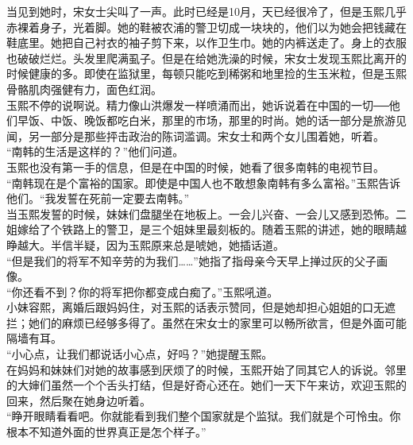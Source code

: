 当见到她时，宋女士尖叫了一声。此时已经是10月，天已经很冷了，但是玉熙几乎赤裸着身子，光着脚。她的鞋被农浦的警卫切成一块块的，他们以为她会把钱藏在鞋底里。她把自己衬衣的袖子剪下来，以作卫生巾。她的内裤送走了。身上的衣服也破破烂烂。头发里爬满虱子。但是在给她洗澡的时候，宋女士发现玉熙比离开的时候健康的多。即使在监狱里，每顿只能吃到稀粥和地里捡的生玉米粒，但是玉熙骨骼肌肉强健有力，面色红润。\\

玉熙不停的说啊说。精力像山洪爆发一样喷涌而出，她诉说着在中国的一切──他们早饭、中饭、晚饭都吃白米，那里的市场，那里的时尚。她的话一部分是旅游见闻，另一部分是那些抨击政治的陈词滥调。宋女士和两个女儿围着她，听着。\\

“南韩的生活是这样的？”他们问道。\\

玉熙也没有第一手的信息，但是在中国的时候，她看了很多南韩的电视节目。\\

“南韩现在是个富裕的国家。即使是中国人也不敢想象南韩有多么富裕。”玉熙告诉他们。“我发誓在死前一定要去南韩。”\\

当玉熙发誓的时候，妹妹们盘腿坐在地板上。一会儿兴奋、一会儿又感到恐怖。二姐嫁给了个铁路上的警卫，是三个姐妹里最刻板的。随着玉熙的讲述，她的眼睛越睁越大。半信半疑，因为玉熙原来总是唬她，她插话道。\\

“但是我们的将军不知辛劳的为我们……”她指了指母亲今天早上掸过灰的父子画像。\\

“你还看不到？你的将军把你都变成白痴了。”玉熙吼道。\\

小妹容熙，离婚后跟妈妈住，对玉熙的话表示赞同，但是她却担心姐姐的口无遮拦；她们的麻烦已经够多得了。虽然在宋女士的家里可以畅所欲言，但是外面可能隔墙有耳。\\

“小心点，让我们都说话小心点，好吗？”她提醒玉熙。\\

在妈妈和妹妹们对她的故事感到厌烦了的时候，玉熙开始了同其它人的诉说。邻里的大婶们虽然一个个舌头打结，但是好奇心还在。她们一天下午来访，欢迎玉熙的回来，然后聚在她身边听着。\\

“睁开眼睛看看吧。你就能看到我们整个国家就是个监狱。我们就是个可怜虫。你根本不知道外面的世界真正是怎个样子。”\\

